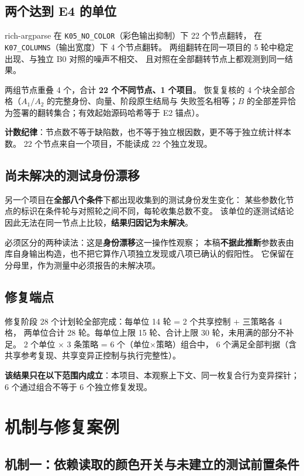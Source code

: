 \documentclass[11pt]{ctexart}
\begin{document}
\subsection{两个达到 E4 的单位}

rich-argparse 在 \texttt{K05\_NO\_COLOR}（彩色输出抑制）下 22 个节点翻转，
在 \texttt{K07\_COLUMNS}（输出宽度）下 4 个节点翻转。
两组翻转在同一项目的 5 轮中稳定出现、与独立 B0 对照的噪声不相交、
且对照在全部翻转节点上都观测到同一结果。

两组节点重叠 4 个，合计 \textbf{22 个不同节点、1 个项目}。
恢复复核的 4 个块全部合格（$A_1/A_2$ 的完整身份、向量、阶段原生结局与
失败签名相等；$B$ 的全部差异恰为签署的翻转集合；有效起始源码哈希等于 E2 锚点）。

\textbf{计数纪律}：节点数不等于缺陷数，也不等于独立根因数，更不等于独立统计样本数。
22 个节点来自一个项目，不能读成 22 个独立发现。

\subsection{尚未解决的测试身份漂移}

另一个项目在\textbf{全部八个条件}下都出现收集到的测试身份发生变化：
某些参数化节点的标识在条件轮与对照轮之间不同，每轮收集总数不变。
该单位的逐测试结论因此无法在同一节点上比较，\textbf{结果归因记为未解决}。

必须区分的两种读法：这是\textbf{身份漂移}这一操作性观察；
本稿\textbf{不据此推断}参数表由库自身输出构造，也不把它算作八项独立发现或八项已确认的假阳性。
它保留在分母里，作为测量中必须报告的未解决项。

\subsection{修复端点}

修复阶段 28 个计划轮全部完成：每单位 14 轮 = 2 个共享控制 + 三策略各 4 格，
两单位合计 28 轮。每单位上限 15 轮、合计上限 30 轮，未用满的部分不补足。
2 个单位 × 3 条策略 = 6 个（单位×策略）组合中，
6 个满足全部判据（含共享参考复现、共享变异正控制与执行完整性）。

\textbf{该结果只在以下范围内成立}：本项目、本观察上下文、同一枚复合行为变异探针；
6 个通过组合不等于 6 个独立修复发现。

\section{机制与修复案例}

\subsection{机制一：依赖读取的颜色开关与未建立的测试前置条件}
\end{document}

